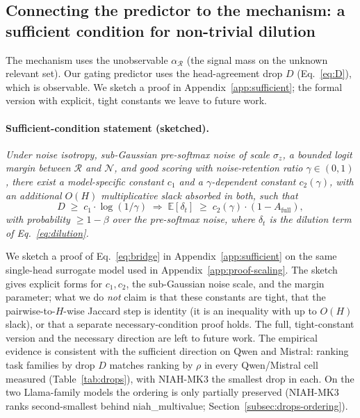 \documentclass{article}
\begin{document}
\subsection{Connecting the predictor to the mechanism: a sufficient
condition for non-trivial dilution}
\label{subsec:conjecture}

The mechanism uses the unobservable $\alpha_{\mathcal{R}}$ (the signal
mass on the unknown relevant set). Our gating predictor uses the
head-agreement drop $D$ (Eq.~\eqref{eq:D}), which is observable. We
sketch a proof in Appendix~\ref{app:sufficient}; the formal version with
explicit, tight constants we leave to future work.

\paragraph{Sufficient-condition statement (sketched).}
\emph{Under noise isotropy, sub-Gaussian pre-softmax noise of scale
$\sigma_z$, a bounded logit margin between $\mathcal{R}$ and
$\mathcal{N}$, and good scoring with noise-retention ratio $\gamma \in
(0, 1)$, there exist a model-specific constant $c_1$ and a
$\gamma$-dependent constant $c_2(\gamma)$, with an additional $O(H)$
multiplicative slack absorbed in both, such that}
\begin{equation}
\label{eq:bridge}
D \;\ge\; c_1 \cdot \log(1/\gamma)
\;\Longrightarrow\;
\mathbb{E}[\delta_t] \;\ge\; c_2(\gamma) \cdot (1 - A_{\mathrm{full}}),
\end{equation}
\emph{with probability $\geq 1 - \beta$ over the pre-softmax noise, where
$\delta_t$ is the dilution term of Eq.~\eqref{eq:dilution}.}

We sketch a proof of Eq.~\eqref{eq:bridge} in
Appendix~\ref{app:sufficient} on the same single-head surrogate model used
in Appendix~\ref{app:proof-scaling}. The sketch gives explicit forms for
$c_1, c_2$, the sub-Gaussian noise scale, and the margin parameter; what
we do \emph{not} claim is that these constants are tight, that the
pairwise-to-$H$-wise Jaccard step is identity (it is an inequality with
up to $O(H)$ slack), or that a separate necessary-condition proof holds.
The full, tight-constant version and the necessary direction are left to
future work. The empirical evidence is consistent with the sufficient
direction on Qwen and Mistral: ranking task families by drop $D$ matches
ranking by $\rho$ in every Qwen/Mistral cell measured
(Table~\ref{tab:drops}), with NIAH-MK3 the smallest drop in each. On the
two Llama-family models the ordering is only partially preserved
(NIAH-MK3 ranks second-smallest behind niah\_multivalue;
Section~\ref{subsec:drops-ordering}).
\end{document}
